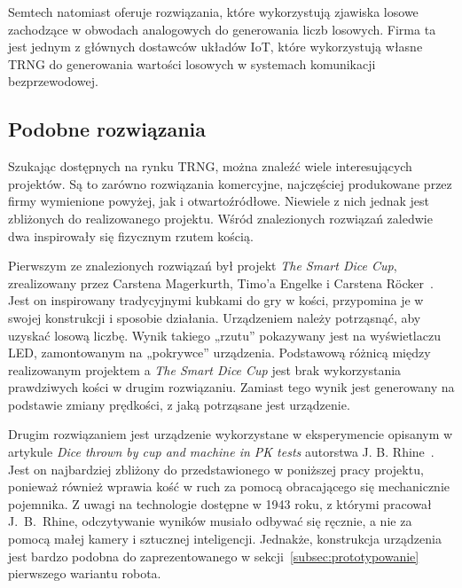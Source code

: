 Semtech natomiast oferuje rozwiązania, które wykorzystują zjawiska losowe
zachodzące w obwodach analogowych do generowania liczb losowych.
Firma ta jest jednym z głównych dostawców układów IoT, które wykorzystują własne TRNG
do generowania wartości losowych w systemach komunikacji bezprzewodowej.


\subsection{Podobne rozwiązania}\label{sec:podobne-rozwiazania}

Szukając dostępnych na rynku TRNG, można znaleźć wiele interesujących projektów. Są to zarówno rozwiązania komercyjne, 
najczęściej produkowane przez firmy wymienione powyżej, jak i otwartoźródłowe. Niewiele z nich jednak jest zbliżonych 
do realizowanego projektu. Wśród znalezionych rozwiązań zaledwie dwa inspirowały się fizycznym rzutem kością.

Pierwszym ze znalezionych rozwiązań był projekt \textit{The Smart Dice Cup}, zrealizowany przez Carstena Magerkurth,
Timo'a Engelke i Carstena Röcker~\cite{SmartDice}.
Jest on inspirowany tradycyjnymi kubkami do gry w kości, przypomina je w swojej konstrukcji i sposobie działania.
Urządzeniem należy potrząsnąć, aby uzyskać losową liczbę.
Wynik takiego „rzutu” pokazywany jest na wyświetlaczu LED, zamontowanym na „pokrywce” urządzenia.
Podstawową różnicą między realizowanym projektem a \textit{The Smart Dice Cup} jest brak wykorzystania prawdziwych
kości w drugim rozwiązaniu.
Zamiast tego wynik jest generowany na podstawie zmiany prędkości, z jaką potrząsane jest urządzenie.

Drugim rozwiązaniem jest urządzenie wykorzystane w eksperymencie opisanym w artykule \textit{Dice thrown by cup and machine in PK tests} autorstwa J. B. Rhine~\cite{PK}.
Jest on najbardziej zbliżony do przedstawionego w poniższej pracy projektu, ponieważ również wprawia kość w
ruch za pomocą obracającego się mechanicznie pojemnika.
Z uwagi na technologie dostępne w 1943 roku, z którymi pracował J.~B.~Rhine, odczytywanie wyników musiało odbywać się ręcznie, a nie za pomocą małej kamery i sztucznej inteligencji.
Jednakże, konstrukcja urządzenia jest bardzo podobna do zaprezentowanego w sekcji~\ref{subsec:prototypowanie} pierwszego wariantu robota.